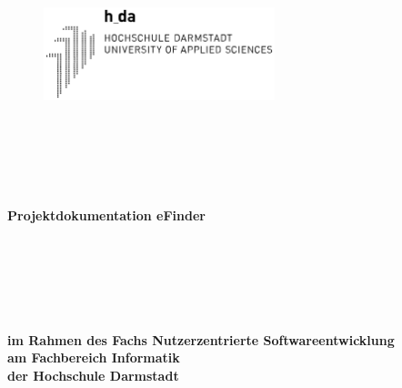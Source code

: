  \thispagestyle{empty}
\begin{titlepage}
	 \thispagestyle{empty}
\begin{center}
	 \thispagestyle{empty}
\begin{figure}[t]
	\centering
	\includegraphics[width=0.6\textwidth]{Hda_logo.svg.png}
	
\end{figure}

$~~$\\
\paragraph{}$~~$\\
\paragraph{}$~~$\\
\textbf{\huge Projektdokumentation eFinder}\paragraph{}$~~$\\
\paragraph{}$~~$\\
\paragraph{}$~~$\\
\textbf{im Rahmen des Fachs Nutzerzentrierte Softwareentwicklung}\\ \textbf{am Fachbereich Informatik}\\ \textbf{der Hochschule Darmstadt}

\end{center}
\end{titlepage}

